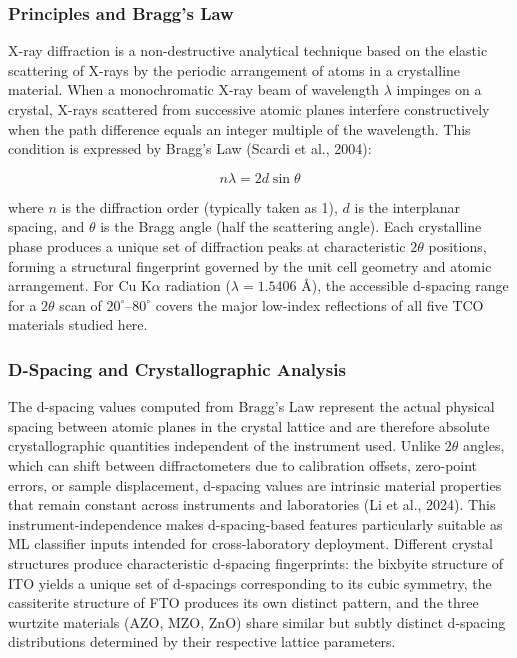 \documentclass[12pt, oneside]{article} %
\begin{document}
\subsubsection{Principles and Bragg's Law}

X-ray diffraction is a non-destructive analytical technique based on the elastic scattering of X-rays by the periodic arrangement of atoms in a crystalline material. When a monochromatic X-ray beam of wavelength $\lambda$ impinges on a crystal, X-rays scattered from successive atomic planes interfere constructively when the path difference equals an integer multiple of the wavelength. This condition is expressed by Bragg's Law (Scardi et al., 2004):

\begin{equation}
n\lambda = 2d\sin\theta
\end{equation}

where $n$ is the diffraction order (typically taken as 1), $d$ is the interplanar spacing, and $\theta$ is the Bragg angle (half the scattering angle). Each crystalline phase produces a unique set of diffraction peaks at characteristic $2\theta$ positions, forming a structural fingerprint governed by the unit cell geometry and atomic arrangement. For Cu K$\alpha$ radiation ($\lambda = 1.5406$ \AA), the accessible d-spacing range for a $2\theta$ scan of $20^{\circ}$--$80^{\circ}$ covers the major low-index reflections of all five TCO materials studied here.


\subsubsection{D-Spacing and Crystallographic Analysis}

The d-spacing values computed from Bragg's Law represent the actual physical spacing between atomic planes in the crystal lattice and are therefore absolute crystallographic quantities independent of the instrument used. Unlike $2\theta$ angles, which can shift between diffractometers due to calibration offsets, zero-point errors, or sample displacement, d-spacing values are intrinsic material properties that remain constant across instruments and laboratories (Li et al., 2024). This instrument-independence makes d-spacing-based features particularly suitable as ML classifier inputs intended for cross-laboratory deployment. Different crystal structures produce characteristic d-spacing fingerprints: the bixbyite structure of ITO yields a unique set of d-spacings corresponding to its cubic symmetry, the cassiterite structure of FTO produces its own distinct pattern, and the three wurtzite materials (AZO, MZO, ZnO) share similar but subtly distinct d-spacing distributions determined by their respective lattice parameters.
\end{document}

